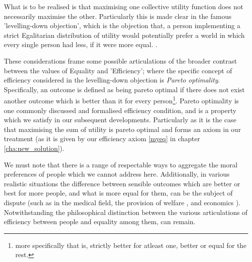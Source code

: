 What is to be realised is that maximising one collective utility function does not necessarily maximise the other.
Particularly this is made clear in the famous 'levelling-down objection', which is the objection that, a person implementing a strict Egalitarian distribution of utility would potentially prefer a world in which every single person had less, if it were more equal. \cite{temkin_2003, equalityandpriorityparfit}.

These considerations frame some possible articulations of the broader contrast between the values of Equality and 'Efficiency'; where the specific concept of efficiency considered in the levelling-down objection is \textit{Pareto optimality}.
Specifically, an outcome is defined as being pareto optimal if there does not exist another outcome which is better than it for every person\footnote{more specifically that is, strictly better for atleast one, better or equal for the rest.}.
Pareto optimality is one commonly discussed and formalised efficiency condition, and is a property which we satisfy in our subsequent developments.
Particularly as it is the case that maximising the sum of utility is pareto optimal \cite{TheoriesofValueAggregation} and forms an axiom in our treatment (as it is given by our efficiency axiom \eqref{myeq} in chapter \ref{cha:new_solution}).

We must note that there is a range of respectable ways to aggregate the moral preferences of people which we cannot address here.
Additionally, in various realistic situations the difference between sensible outcomes which are better or best for more people, and what is more equal for them, can be the subject of dispute (such as in the medical field\cite{Reidpath2012,RePEc:chy:respap:120cherp}, the provision of welfare \cite{10.2307/27522452}, and economics \cite{10.1093/oep/gpz040}). Notwithstanding the philosophical distinction between the various articulations of efficiency between people and equality among them, can remain.



